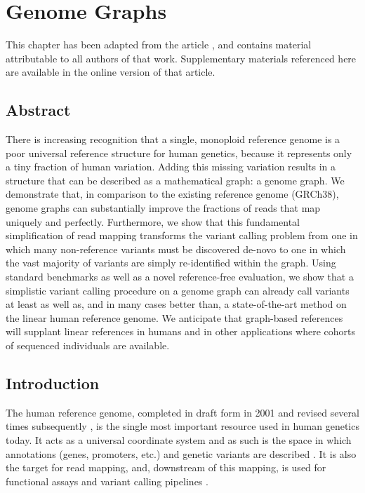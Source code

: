 
\chapter{Genome Graphs}
\label{ch:bakeoff}

This chapter has been adapted from the article \citet{novak2017genome}, and contains material attributable to all authors of that work. Supplementary materials referenced here are available in the online version of that article.

\section{Abstract}

There is increasing recognition that a single, monoploid reference
genome is a poor universal reference structure for human genetics,
because it represents only a tiny fraction of human variation. Adding
this missing variation results in a structure that can be described as a
mathematical graph: a genome graph. We demonstrate that, in comparison
to the existing reference genome (GRCh38), genome graphs can
substantially improve the fractions of reads that map uniquely and
perfectly. Furthermore, we show that this fundamental simplification of
read mapping transforms the variant calling problem from one in which
many non-reference variants must be discovered de-novo to one in which
the vast majority of variants are simply re-identified within the graph.
Using standard benchmarks as well as a novel reference-free evaluation,
we show that a simplistic variant calling procedure on a genome graph
can already call variants at least as well as, and in many cases better
than, a state-of-the-art method on the linear human reference genome. We
anticipate that graph-based references will supplant linear references
in humans and in other applications where cohorts of sequenced
individuals are available.

\section{Introduction}

The human reference genome, completed in draft form in 2001 and revised
several times subsequently \cite{Lander2001-gm,Church2011-ob}, is the
single most important resource used in human genetics today. It acts as
a universal coordinate system and as such is the space in which
annotations (genes, promoters, etc.) and genetic variants are described
\cite{Harrow2012-ei,ENCODE_Project_Consortium2012-rx,1000_Genomes_Project_Consortium2015-mp}.
It is also the target for read mapping, and, downstream of this mapping,
is used for functional assays and variant calling pipelines
\cite{Li2009-tj,depristo2011framework}.

